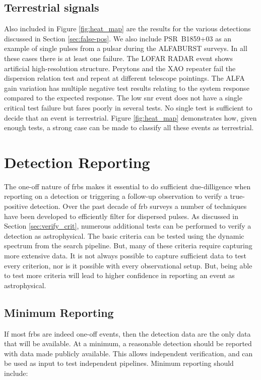 \documentclass[a4paper,fleqn,usenatbib]{mnras}
\begin{document}
\subsection{Terrestrial signals}

Also included in Figure \ref{fig:heat_map} are the results for the various
detections discussed in Section \ref{sec:false-pos}. We also include
PSR~B1859+03 as an example of single pulses from a pulsar during the ALFABURST
surveys.  In all these cases there is at least one failure.  The LOFAR RADAR
event shows artificial high-resolution structure.  Perytons and the XAO repeater
fail the dispersion relation test and repeat at different telescope pointings.
The ALFA gain variation has multiple negative test results relating to the
system response compared to the expected response.  The low \gls{snr} event does
not have a single critical test failure but fares poorly in several tests.  No
single test is sufficient to decide that an event is terrestrial. Figure
\ref{fig:heat_map} demonstrates how, given enough tests, a strong case can be
made to classify all these events as terrestrial.

\section{Detection Reporting}
\label{sec:detect_report}

The one-off nature of \glspl{frb} makes it essential to do sufficient
due-dilligence when reporting on a detection or triggering a follow-up
observation to verify a true-positive detection. Over the past decade of
\gls{frb} surveys a number of techniques have been developed to efficiently
filter for dispersed pulses. As discussed in Section \ref{sec:verify_crit},
numerous additional tests can be performed to verify a detection as
astrophysical. The basic criteria can be tested using the dynamic spectrum from
the search pipeline. But, many of these criteria require capturing more
extensive data. It is not always possible to capture sufficient data to test
every criterion, nor is it possible with every observational setup.  But, being
able to test more criteria will lead to higher confidence in reporting an event
as astrophysical.

\subsection{Minimum Reporting}

If most \glspl{frb} are indeed one-off events, then the detection data are the
only data that will be available.  At a minimum, a reasonable detection should
be reported with data made publicly available.  This allows independent
verification, and can be used as input to test independent
pipelines. Minimum reporting should include:
\end{document}
